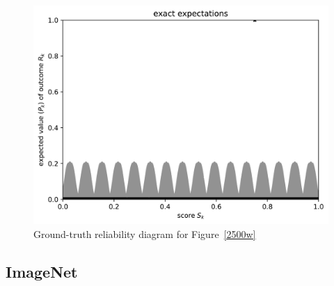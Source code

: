 \documentclass{article}
\begin{document}
\begin{figure}
\begin{centering}

\parbox{\imsize}{\includegraphics[width=\imsize]
                {./codes/weighted/50000_2500_10_3/exact.jpg}}

\end{centering}
\caption{Ground-truth reliability diagram for Figure~\ref{2500w}}
\label{2500we}
\end{figure}



\subsection{ImageNet}
\label{imagenetex}
\end{document}
